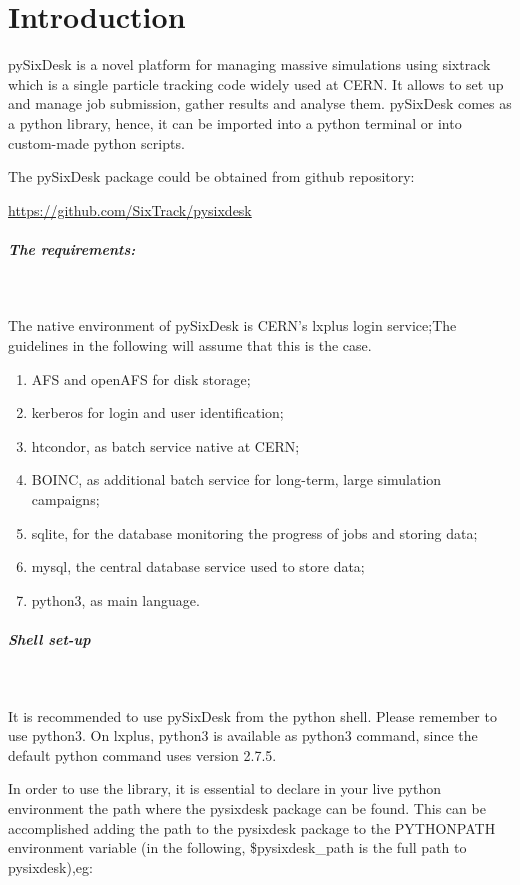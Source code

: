 
\chapter{Introduction} \label{Intro}

pySixDesk is a novel platform for managing massive simulations using sixtrack  which is a single particle tracking code widely used at CERN. It allows to set up and manage job submission, gather results and analyse them. pySixDesk comes as a python library, hence, it can be imported into a python terminal or into custom-made python scripts.

The pySixDesk package could be obtained from github repository:

\url{https://github.com/SixTrack/pysixdesk}


\paragraph{The requirements:}~

The native environment of pySixDesk is CERN's lxplus login service;The guidelines in the following will assume that this is the case.
\begin{enumerate}
    \item AFS and openAFS for disk storage;
    \item kerberos for login and user identification;
    \item htcondor, as batch service native at CERN;
    \item BOINC, as additional batch service for long-term, large simulation campaigns;
    \item sqlite, for the database monitoring the progress of jobs and storing data;
    \item mysql, the central database service used to store data;
    \item python3, as main language.
\end{enumerate}


\paragraph{Shell set-up}~

It is recommended to use pySixDesk from the python shell. Please remember to use python3. On lxplus, python3 is available as python3 command, since the default python command uses version 2.7.5.

In order to use the library, it is essential to declare in your live python environment the path where the pysixdesk package can be found. This can be accomplished adding the path to the pysixdesk package to the PYTHONPATH environment variable (in the following, \$pysixdesk\_path is the full path to pysixdesk),eg:

